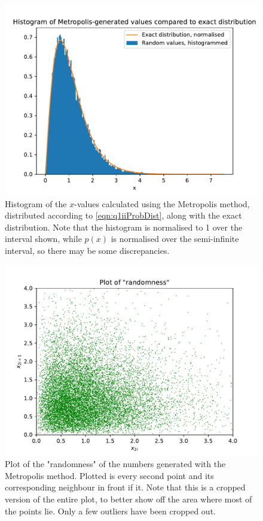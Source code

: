 \documentclass[11pt]{article}
\begin{document}
\begin{enumerate}
\begin{enumerate}
        \begin{figure}[H]
            \begin{center}
                \includegraphics[width=.65\textwidth]{Plots/histogram.pdf}
                \caption{Histogram of the $x$-values calculated using the Metropolis method, distributed according to \cref{eqn:q1iiProbDist}, along with the exact distribution. Note that the histogram is normalised to 1 over the interval shown, while $p(x)$ is normalised over the semi-infinite interval, so there may be some discrepancies.}
                \label{fig:histogram}
            \end{center}
        \end{figure}

        \begin{figure}[H]
            \begin{center}
                \includegraphics[width=.65\textwidth]{Plots/randomness.pdf}
                \caption{Plot of the "randomness" of the numbers generated with the Metropolis method. Plotted is every second point and its corresponding neighbour in front if it. Note that this is a cropped version of the entire plot, to better show off the area where most of the points lie. Only a few outliers have been cropped out.}
                \label{fig:randomness}
            \end{center}
        \end{figure}


\end{enumerate}
\end{enumerate}
\end{document}
